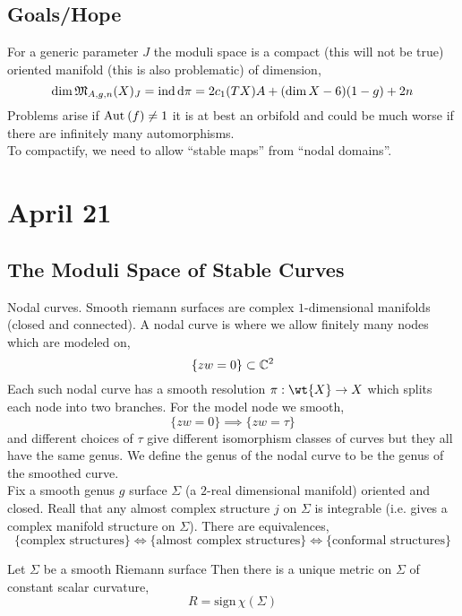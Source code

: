 \documentclass[12pt]{article}
\DeclareMathOperator{\ind}{\mathrm{ind}}
\begin{document}
\subsection{Goals/Hope}

For a generic parameter $J$ the moduli space is a compact (this will not be true) oriented manifold (this is also problematic) of dimension,
\[ \dim{\mf{M}_{A,g,n}(X)_J} = \ind{\d{\pi}} = 2 c_1(TX) A + (\dim{X} - 6)(1-g) + 2n \]
Problems arise if $\mathrm{Aut}_{} \left( f \right) \neq 1$ it is at best an orbifold and could be much worse if there are infinitely many automorphisms. 
\bigskip\\
To compactify, we need to allow ``stable maps'' from ``nodal domains''.

\renewcommand{\K}[2]{#1}
\renewcommand{\S}[3]{#1 #3{#2#3}}

\newcommand{\test}[2]{#1 {#2}}


\section{April 21}

\subsection{The Moduli Space of Stable Curves}

Nodal curves. Smooth riemann surfaces are complex $1$-dimensional manifolds (closed and connected). A nodal curve is where we allow finitely many nodes which are modeled on,
\[ \{ zw = 0 \} \subset \mathbb{C}^2 \]
Each such nodal curve has a smooth resolution $\pi : \wt{X} \to X$ which splits each node into two branches. For the model node we smooth,
\[ \{ zw = 0 \} \implies \{ zw = \tau \} \]
and different choices of $\tau$ give different isomorphism classes of curves but they all have the same genus. We define the genus of the nodal curve to be the genus of the smoothed curve. 
\bigskip\\
Fix a smooth genus $g$ surface $\Sigma$ (a $2$-real dimensional manifold) oriented and closed. Reall that any almost complex structure $j$ on $\Sigma$ is integrable (i.e. gives a complex manifold structure on $\Sigma$). There are equivalences,
\[ \{ \text{complex structures} \} \iff \{ \text{almost complex structures} \} \iff \{ \text{conformal structures} \} \]

\begin{thm}[Uniformization]
Let $\Sigma$ be a smooth Riemann surface Then there is a unique metric on $\Sigma$ of constant scalar curvature,
\[ R = \mathrm{sign} \, \chi(\Sigma) \]
\end{thm}
\end{document}
